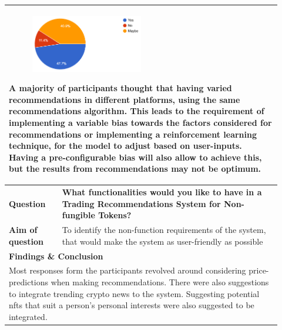 \begin{longtable}{|p{0.18\linewidth}|p{0.74\linewidth}|}
\multicolumn{2}{|l|}{
\parbox{\textwidth}{
\begin{figure}
\includegraphics[width=0.5\textwidth]{images/SRS/survey/survey-6.png}
\end{figure}

A majority of participants thought that having varied recommendations in different platforms, using the same recommendations algorithm. This leads to the requirement of implementing a variable bias towards the factors considered for recommendations or implementing a reinforcement learning technique, for the model to adjust based on user-inputs. Having a pre-configurable bias will also allow to achieve this, but the results from recommendations may not be optimum.
}
}
\\
\hline
\textbf{Question} & \textbf{What functionalities would you like to have in a Trading Recommendations System for Non-fungible Tokens?} \\
\hline
\textbf{Aim of question} & To identify the non-function requirements of the system, that would make the system as user-friendly as possible \\
\hline
\multicolumn{2}{|l|}{\textbf{Findings \& Conclusion}} \\

\multicolumn{2}{|l|}{
\parbox{\textwidth}{
Most responses form the participants revolved around considering price-predictions when making recommendations. There were also suggestions to integrate trending crypto news to the system. Suggesting potential \gls{nft}s that suit a person's personal interests were also suggested to be integrated.
}} \\ 
\hline
\end{longtable}


